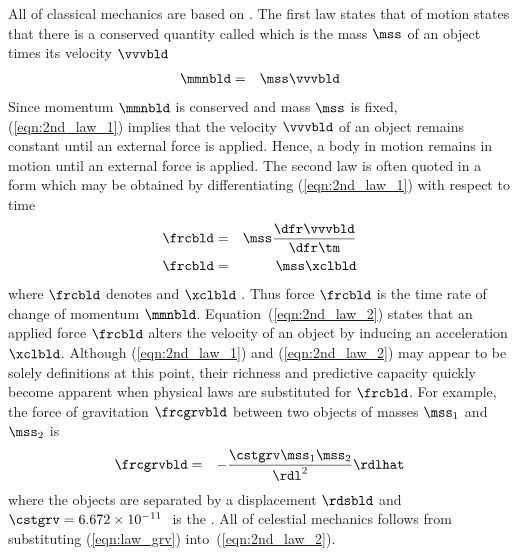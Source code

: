 \documentclass[12pt,twoside]{book}
\begin{document}
All of classical mechanics are based on .  
The first law states that
 of motion states that there is a conserved
quantity called  which is the mass $\mss$ of an
object times its velocity $\vvvbld$
\begin{eqnarray}
\mmnbld & = & \mss \vvvbld
\label{eqn:2nd_law_1}
\end{eqnarray}
Since momentum $\mmnbld$ is conserved and mass $\mss$ is fixed,
(\ref{eqn:2nd_law_1}) implies that the velocity $\vvvbld$ of an object 
remains constant until an external force is applied.
Hence, a body in motion remains in motion until an external force is
applied. 
The second law is often quoted in a form which may be obtained by
differentiating (\ref{eqn:2nd_law_1}) with respect to time
\begin{eqnarray}
\frcbld & = & \mss \frac{\dfr\vvvbld}{\dfr\tm} \nonumber \\
\frcbld & = & \mss \xclbld
\label{eqn:2nd_law_2}
\end{eqnarray}
where $\frcbld$ denotes  and $\xclbld$
. 
Thus force $\frcbld$ is the time rate of change of momentum
$\mmnbld$. 
Equation~(\ref{eqn:2nd_law_2}) states that an applied force $\frcbld$
alters the velocity of an object by inducing an acceleration
$\xclbld$.  
Although (\ref{eqn:2nd_law_1}) and (\ref{eqn:2nd_law_2}) may appear to 
be solely definitions at this point, their richness and predictive
capacity quickly become apparent when physical laws are substituted
for $\frcbld$.
For example, the force of gravitation $\frcgrvbld$ between two objects of
masses $\mss_{1}$ and $\mss_{2}$ is 
\begin{eqnarray}
\frcgrvbld & = & - \frac{\cstgrv \mss_{1} \mss_{2}}{ \rdl^{2} } \rdlhat
\label{eqn:law_grv}
\end{eqnarray}
where the objects are separated by a displacement $\rdsbld$ and 
$\cstgrv = 6.672 \times 10^{-11}$\,\NmSxkg\ is the 
.
All of celestial mechanics follows from substituting
(\ref{eqn:law_grv}) into~(\ref{eqn:2nd_law_2}).
\end{document}
